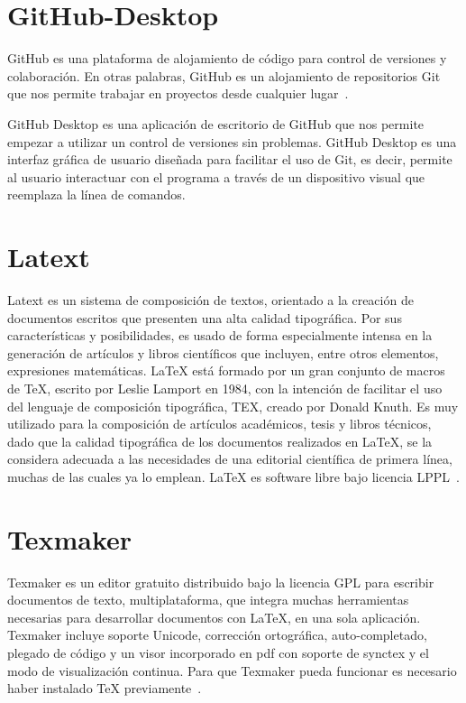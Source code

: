 \section{GitHub-Desktop}
GitHub es una plataforma de alojamiento de código para control de versiones y colaboración. En otras palabras, GitHub es un alojamiento de repositorios Git que nos permite trabajar en proyectos desde cualquier lugar~\cite{gitHub}.

GitHub Desktop es una aplicación de escritorio de GitHub que nos permite empezar a utilizar un control de versiones sin problemas. GitHub Desktop es una interfaz gráfica de usuario diseñada para facilitar el uso de Git, es decir, permite al usuario interactuar con el programa a través de un dispositivo visual que reemplaza la línea de comandos.

\section{Latext}
Latext es un sistema de composición de textos, orientado a la creación de documentos escritos que presenten una alta calidad tipográfica. Por sus características y posibilidades, es usado de forma especialmente intensa en la generación de artículos y libros científicos que incluyen, entre otros elementos, expresiones matemáticas.
LaTeX está formado por un gran conjunto de macros de TeX, escrito por Leslie Lamport en 1984, con la intención de facilitar el uso del lenguaje de composición tipográfica, TEX, creado por Donald Knuth. Es muy utilizado para la composición de artículos académicos, tesis y libros técnicos, dado que la calidad tipográfica de los documentos realizados en LaTeX, se la considera adecuada a las necesidades de una editorial científica de primera línea, muchas de las cuales ya lo emplean.
LaTeX es software libre bajo licencia LPPL~\cite{wiki:latex}.

\section{Texmaker}
Texmaker es un editor gratuito distribuido bajo la licencia GPL para escribir documentos de texto, multiplataforma, que integra muchas herramientas necesarias para desarrollar documentos con LaTeX, en una sola aplicación. Texmaker incluye soporte Unicode, corrección ortográfica, auto-completado, plegado de código y un visor incorporado en pdf con soporte de synctex y el modo de visualización continua.
Para que Texmaker pueda funcionar es necesario haber instalado TeX previamente~\cite{wiki:texmaker}.

